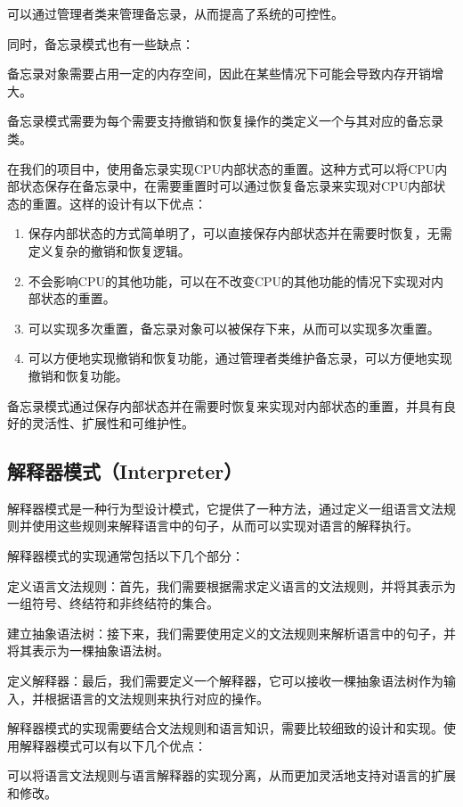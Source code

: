 \documentclass[cn,black,12pt,normal]{elegantnote}
\begin{document}
可以通过管理者类来管理备忘录，从而提高了系统的可控性。

同时，备忘录模式也有一些缺点：

备忘录对象需要占用一定的内存空间，因此在某些情况下可能会导致内存开销增大。

备忘录模式需要为每个需要支持撤销和恢复操作的类定义一个与其对应的备忘录类。

在我们的项目中，使用备忘录实现CPU内部状态的重置。这种方式可以将CPU内部状态保存在备忘录中，在需要重置时可以通过恢复备忘录来实现对CPU内部状态的重置。这样的设计有以下优点：

\begin{enumerate}
  \item 保存内部状态的方式简单明了，可以直接保存内部状态并在需要时恢复，无需定义复杂的撤销和恢复逻辑。
  \item 不会影响CPU的其他功能，可以在不改变CPU的其他功能的情况下实现对内部状态的重置。
  \item 可以实现多次重置，备忘录对象可以被保存下来，从而可以实现多次重置。
  \item 可以方便地实现撤销和恢复功能，通过管理者类维护备忘录，可以方便地实现撤销和恢复功能。
\end{enumerate}
备忘录模式通过保存内部状态并在需要时恢复来实现对内部状态的重置，并具有良好的灵活性、扩展性和可维护性。



\subsection{解释器模式（Interpreter）}

解释器模式是一种行为型设计模式，它提供了一种方法，通过定义一组语言文法规则并使用这些规则来解释语言中的句子，从而可以实现对语言的解释执行。

解释器模式的实现通常包括以下几个部分：

定义语言文法规则：首先，我们需要根据需求定义语言的文法规则，并将其表示为一组符号、终结符和非终结符的集合。

建立抽象语法树：接下来，我们需要使用定义的文法规则来解析语言中的句子，并将其表示为一棵抽象语法树。

定义解释器：最后，我们需要定义一个解释器，它可以接收一棵抽象语法树作为输入，并根据语言的文法规则来执行对应的操作。

解释器模式的实现需要结合文法规则和语言知识，需要比较细致的设计和实现。使用解释器模式可以有以下几个优点：

可以将语言文法规则与语言解释器的实现分离，从而更加灵活地支持对语言的扩展和修改。
\end{document}

